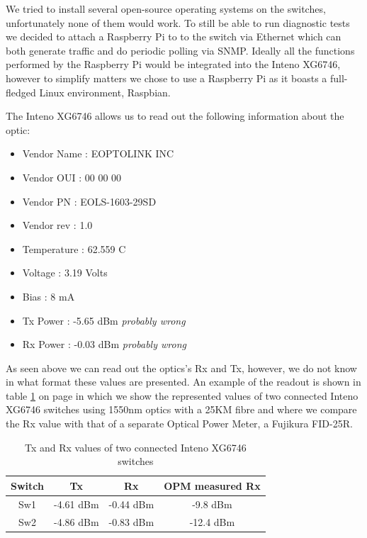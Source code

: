 \documentclass{article}
\begin{document}
We tried to install several open-source operating systems on the switches, unfortunately none of them would work. To still be able to run diagnostic tests we decided to attach a Raspberry Pi to to the switch via Ethernet which can both generate traffic and do periodic polling via SNMP.
Ideally all the functions performed by the Raspberry Pi would be integrated into the Inteno XG6746, however to simplify matters we chose to use a Raspberry Pi as it boasts a full-fledged Linux environment, Raspbian\cite{raspbian:raspbian}.

The Inteno XG6746 allows us to read out the following information about the optic:
\begin{itemize}
	\item Vendor Name : EOPTOLINK INC   
	\item Vendor OUI  : 00 00 00
	\item Vendor PN   : EOLS-1603-29SD  
	\item Vendor rev  : 1.0 
	\item Temperature : 62.559 C
	\item Voltage     : 3.19 Volts
	\item Bias        : 8 mA
	\item Tx Power    : -5.65 dBm \emph{probably wrong}
	\item Rx Power    : -0.03 dBm \emph{probably wrong}
\end{itemize}

As seen above we can read out the optics’s Rx and Tx, however, we do not know in what format these values are presented. An example of the readout is shown in table \ref{tab:crazy-inteno} on page \pageref{tab:crazy-inteno} in which we show the represented values of two connected Inteno XG6746 switches using 1550nm optics with a 25KM fibre and where we compare the Rx value with that of a separate Optical Power Meter, a Fujikura FID-25R.

\begin{table}[h]
\centering
\begin{tabular}{|c|c|c|c|}
\hline 
\textbf{Switch} & \textbf{Tx} & \textbf{Rx} & \textbf{OPM measured Rx}\\ 
\hline 
Sw1 & -4.61 dBm & -0.44 dBm & -9.8 dBm\\ 
\hline 
Sw2 & -4.86 dBm & -0.83 dBm  & -12.4 dBm \\ 
\hline 
\end{tabular} 
\caption{Tx and Rx values of two connected Inteno XG6746 switches}
\label{tab:crazy-inteno}
\end{table}
\end{document}
